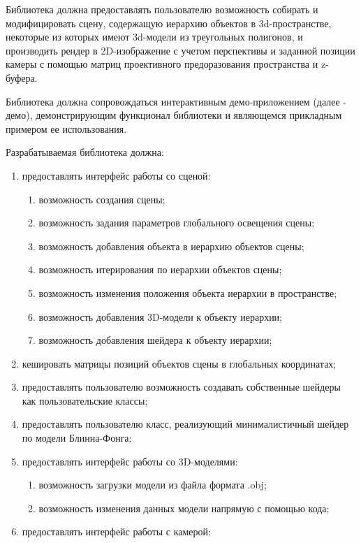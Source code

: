 Библиотека должна предоставлять пользователю возможность собирать и модифицировать сцену, содержащую иерархию объектов в 3d-пространстве, некоторые из которых имеют 3d-модели из треугольных полигонов, и производить рендер в 2D-изображение с учетом перспективы и заданной позиции камеры с помощью матриц проективного предоразования пространства и z-буфера.

Библиотека должна сопровождаться интерактивным демо-приложением (далее - демо), демонстрирующим функционал библиотеки и являющемся прикладным примером ее использования.

Разрабатываемая библиотека должна: 
\begin{enumerate}
    \item предоставлять интерфейс работы со сценой:
    \begin{enumerate}
        \item возможность создания сцены;
        \item возможность задания параметров глобального освещения сцены;
        \item возможность добавления объекта в иерархию объектов сцены;
        \item возможность итерирования по иерархии объектов сцены;
        \item возможность изменения положения объекта иерархии в пространстве;
        \item возможность добавления 3D-модели к объекту иерархии;
        \item возможность добавления шейдера к объекту иерархии;
    \end{enumerate}
    \item кешировать матрицы позиций объектов сцены в глобальных координатах;
    \item предоставлять пользователю возможность создавать собственные шейдеры как пользовательские классы;
    \item предоставлять пользователю класс, реализующий минималистичный шейдер по модели Блинна-Фонга;
   \item предоставлять интерфейс работы со 3D-моделями:
    \begin{enumerate}
        \item возможность загрузки модели из файла формата .obj;
        \item возможность изменения данных модели напрямую с помощью кода;
    \end{enumerate}
    \item предоставлять интерфейс работы с камерой:

\end{enumerate}
